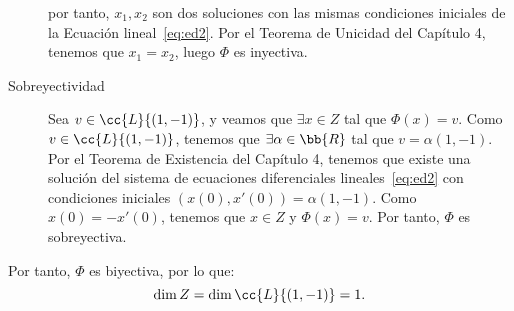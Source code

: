 \documentclass[12pt]{article}
\begin{document}
\begin{ejercicio}
\begin{description}
            por tanto, $x_1,x_2$ son dos soluciones con las mismas condiciones iniciales de la Ecuación lineal~\eqref{eq:ed2}. Por el Teorema de Unicidad del Capítulo 4, tenemos que $x_1=x_2$, luego $\Phi$ es inyectiva.

            \item[Sobreyectividad] Sea $v\in \cc{L}\{(1,-1)\}$, y veamos que $\exists x\in Z$ tal que $\Phi(x)=v$. Como $v\in \cc{L}\{(1,-1)\}$, tenemos que $\exists \alpha \in \bb{R}$ tal que $v=\alpha(1,-1)$. Por el Teorema de Existencia del Capítulo 4, tenemos que existe una solución del sistema de ecuaciones diferenciales lineales~\eqref{eq:ed2} con condiciones iniciales $(x(0),x'(0)) = \alpha(1,-1)$. Como $x(0)=-x'(0)$, tenemos que $x\in Z$ y $\Phi(x)=v$. Por tanto, $\Phi$ es sobreyectiva.
        \end{description}

        Por tanto, $\Phi$ es biyectiva, por lo que:
        \begin{equation*}
            \dim Z = \dim \cc{L}\{(1,-1)\} = 1.
        \end{equation*}
    \end{ejercicio}
\end{document}
